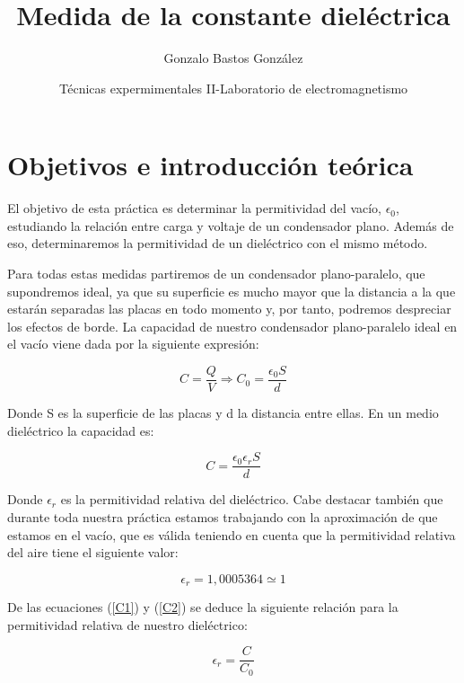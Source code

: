 \documentclass[a4paper,12pt,titlepage]{article}
\title{Medida de la constante dieléctrica}
\author{Gonzalo Bastos González}
\date{Técnicas expermimentales II-Laboratorio de electromagnetismo}
\begin{document}
\maketitle
\tableofcontents

\newpage

\section{Objetivos e introducción teórica}

El objetivo de esta práctica es determinar la permitividad del vacío, $\epsilon_0$, estudiando la relación entre carga y voltaje de un condensador plano. Además de eso, determinaremos la permitividad de un dieléctrico con el mismo método.

Para todas estas medidas partiremos de un condensador plano-paralelo, que supondremos ideal, ya que su superficie es mucho mayor que la distancia a la que estarán separadas las placas en todo momento y, por tanto, podremos despreciar los efectos de borde. La capacidad de nuestro condensador plano-paralelo ideal en el vacío viene dada por la siguiente expresión:

\begin{equation}
    C =\frac{Q}{V} \Rightarrow C_0 = \frac{\epsilon_0S}{d}
    \label{C1}
\end{equation}

Donde S es la superficie de las placas y d la distancia entre ellas. En un medio dieléctrico la capacidad es:

\begin{equation}
    C = \frac{\epsilon_0 \epsilon_r S}{d}
    \label{C2}
\end{equation}

Donde $\epsilon_r$ es la permitividad relativa del dieléctrico. Cabe destacar también que durante toda nuestra práctica estamos trabajando con la aproximación de que estamos en el vacío, que es válida teniendo en cuenta que la permitividad relativa del aire tiene el siguiente valor:

\begin{equation}
    \epsilon_r = 1,0005364 \simeq 1
\end{equation}

De las ecuaciones (\ref{C1}) y (\ref{C2}) se deduce la siguiente relación para la permitividad relativa de nuestro dieléctrico:

\begin{equation}
    \epsilon_r = \frac{C}{C_0}
    \label{e_r}
\end{equation}
\end{document}
